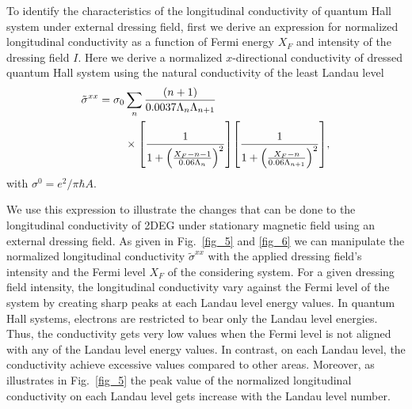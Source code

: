 
To identify the characteristics of the longitudinal conductivity of quantum Hall system under external dressing field, first we derive an expression for normalized longitudinal conductivity as a function of Fermi energy $X_F$ and intensity of the dressing field $I$.
Here we derive a normalized $x$-directional conductivity of dressed quantum Hall system using the natural conductivity of the least Landau level
\begin{equation} \label{eq_35}
  \begin{aligned}
    \tilde{\sigma}^{xx} =
    \sigma_{0} &
    \sum_{n}
    \frac{\qty(n+1)}{0.0037\Lambda_n \Lambda_{n+1}} \\
    & \times
    \qty[
      \frac{1}
      {
        1 + \qty(\frac{X_F - n -1}{0.06\Lambda_n})^2
      }
    ]
    \qty[
      \frac{1}
      {
        1 + \qty(\frac{X_F - n}{0.06\Lambda_{n+1}})^2
      }
    ],
  \end{aligned}
\end{equation}
with $\sigma^0 = e^2/\pi \hbar A$.

We use this expression to illustrate the changes that can be done to the longitudinal conductivity of 2DEG under stationary magnetic field using an external dressing field. As given in Fig.~\ref{fig_5} and \ref{fig_6} we can manipulate the normalized longitudinal conductivity $\tilde{\sigma}^{xx}$ with the applied dressing field's intensity and the Fermi level $X_F$ of the considering system.
For a given dressing field intensity, the longitudinal conductivity vary against the Fermi level of the system by creating sharp peaks at each Landau level energy values.
In quantum Hall systems, electrons are restricted to bear only the Landau level energies. Thus, the conductivity gets very low values when the Fermi level is not aligned with any of the Landau level energy values. In contrast, on each Landau level, the conductivity achieve excessive values compared to other areas. Moreover, as illustrates in Fig.~\ref{fig_5} the peak value of the normalized longitudinal conductivity on each Landau level gets increase with the Landau level number.

